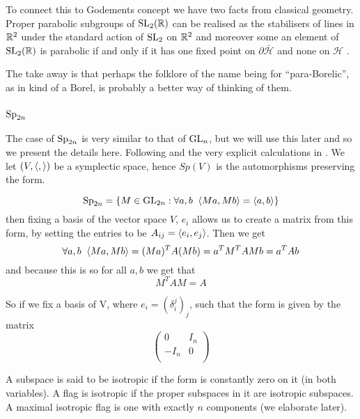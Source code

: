\begin{Remark}
    To connect this to Godements concept we have two facts from classical geometry. Proper parabolic subgroups of \(\SL_2(\R)\) can be realised as the stabilisers of lines in \(\R^2\) under the standard action of \(\operatorname{SL}_2\) on \(\R^2\) \cite[2.6]{borelAutomorphicFormsSL21997} and moreover some an element of \(\SL_2(\R)\) is parabolic if and only if it has one fixed point on \(\partial\bar{\mathcal{H}}\) and none on \(\mathcal{H}\) \cite[3.5]{borelAutomorphicFormsSL21997}. 

    The take away is that perhaps the folklore of the name being for ``para-Borelic'', as in kind of a Borel, is probably a better way of thinking of them.
\end{Remark}

\subsubsection{\(\operatorname{Sp}_{2n}\)}
The case of \(\operatorname{Sp}_{2n}\) is very similar to that of \(\operatorname{GL}_n\), but we will use this later and so we present the details here. Following \cite{conradStandardParabolicSubgroups} and the very explicit calculations in  \cite[\S 8]{BuildingsClassicalGroups}. We let \((V, \langle ,\rangle)\) be a symplectic space, hence \(Sp(V)\) is the automorphisms preserving the form.
\begin{example}
    \[\operatorname{Sp}_{2n} = \{M\in \operatorname{GL}_{2n} :\forall a,b \;\; \langle Ma, Mb\rangle = \langle a,b\rangle\}\]
    then fixing a basis of the vector space \(V\), \(e_i\) allows us to create a matrix from this form, by setting the entries to be \(A_{ij} = \langle e_i, e_j\rangle\). Then we get 
        \[\forall a,b \;\; \langle Ma, Mb\rangle = (Ma)^T A (Mb) = a^T M^T A M b= a^TAb \]
        and because this is so for all \(a,b\) we get that 
        \[M^T A M = A\]

        So if we fix a basis of V, where \(e_i = (\delta_i^j)_j\), such that the form is given by the matrix
        \[\begin{pmatrix}
            0 & I_n \\
            -I_n & 0\\
        \end{pmatrix}\]
\end{example}

A subspace is said to be isotropic if the form is constantly zero on it (in both variables). A flag is isotropic if the proper subspaces in it are isotropic subspaces. A maximal isotropic flag is one with exactly \(n\) components (we elaborate later).

